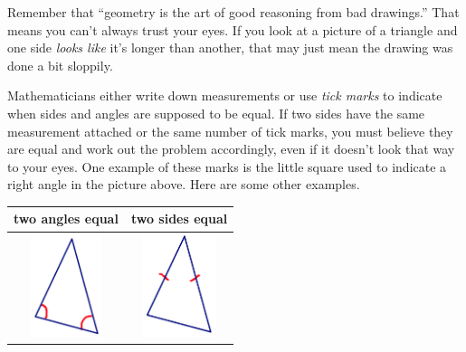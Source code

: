 \documentclass[12pt, reqno]{amsart}
\theoremstyle{remark}
\theoremstyle{definition}
\numberwithin{equation}{section}  %
\begin{document}
\newpage



Remember that ``geometry is the art of good reasoning from bad drawings.'' That means you can't always trust your eyes.  If you look at a picture of a triangle and one side \emph{looks like} it's longer than another, that may just mean the drawing was done a bit sloppily.

Mathematicians either write down measurements or use \emph{tick marks} to indicate when sides and angles are supposed to be equal.  If two sides have the same measurement attached or the same number of tick marks, you must believe they are equal and work out the problem accordingly, even if it doesn't look that way to your eyes.  One example of these marks is the little square used to indicate a right angle in the picture above.  Here are some other examples.

\bigskip



\begin{center}
\begin{tabular}{c|c}\hline
{\bf two angles equal } & {\bf two sides equal} \\
\hline
\includegraphics[height=3cm]{2eqangs} & 
\includegraphics[height=3cm]{2eqsides}  \\
\hline
\end{tabular}

\end{center}



\bigskip
\bigskip
\end{document}
